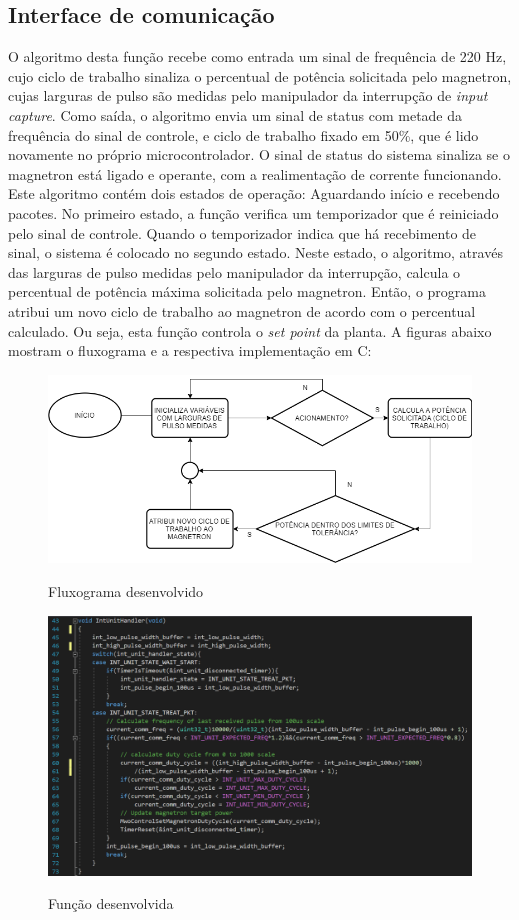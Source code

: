 \subsection{Interface de comunicação}
O algoritmo desta função recebe como entrada  um sinal de frequência de 220 Hz, cujo ciclo de trabalho sinaliza o percentual de potência solicitada pelo magnetron, cujas larguras de pulso são medidas pelo manipulador da interrupção de \textit{input capture}. Como saída, o algoritmo envia um sinal de status com metade da frequência do sinal de controle, e ciclo de trabalho fixado em 50\%, que é lido novamente no próprio microcontrolador. O sinal de status do sistema sinaliza se o magnetron está ligado e operante, com a realimentação de corrente funcionando. Este algoritmo contém dois estados de operação: Aguardando início e recebendo pacotes. No primeiro estado, a função verifica um temporizador que é reiniciado pelo sinal de controle. Quando o temporizador indica que há recebimento de sinal, o sistema é colocado no segundo estado. Neste estado, o algoritmo, através das larguras de pulso medidas pelo manipulador da interrupção, calcula o percentual de potência máxima solicitada pelo magnetron. Então, o programa atribui um novo ciclo de trabalho ao magnetron de acordo com o percentual calculado. Ou seja, esta função controla o \textit{set point} da planta. A figuras abaixo mostram o fluxograma e a respectiva implementação em C:
\begin{figure}[H]
    \centering
    \caption{Fluxograma desenvolvido}
    \includegraphics[width=1\textwidth]{./dados/figuras/flow_comm}
    \label{fig:figura-func_comm}
\end{figure}


\begin{figure}[H]
    \centering
    \caption{Função desenvolvida}
    \includegraphics[width=1\textwidth]{./dados/figuras/func_comm}
    \label{fig:figura-func_comm}
\end{figure}
